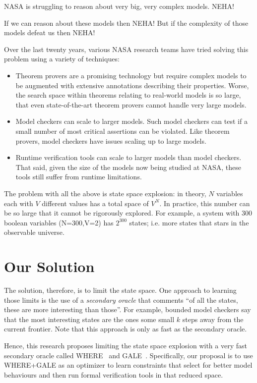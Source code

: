 \documentclass[12pt]{article}
\newcommand{\bi}{\begin{itemize}[leftmargin=0.7cm]}
\newcommand{\ei}{\end{itemize}}
\begin{document}
NASA is struggling to reason about very big, very complex models. NEHA! 

If we can reason about these models then NEHA! But if the complexity of those models
defeat us then NEHA!

Over the last twenty years, various
NASA research teams have tried solving this problem using a variety of techniques:
\bi
\item Theorem provers are a promising technology but require complex models to be augmented with extensive annotations describing their properties. Worse, the search space within theorems relating to real-world models is so large, that even state-of-the-art theorem provers cannot handle very large models.
\item Model checkers can scale to larger models. Such model checkers can test if a small number of most critical assertions can be violated. Like theorem provers, model checkers
have issues scaling up to large models.
\item Runtime verification tools can scale to larger models than model checkers. That
said, given the size of the models now being studied at NASA, these tools still suffer
from runtime limitations.
\ei
The problem with all the above is   state space explosion: in theory,
$N$ variables each with $V$ different values has a total space of $V^N$. In practice,
this number can be so large that it cannot be rigorously explored. For example, a system 
with 300 boolean variables (N=300,V=2) has $2^300$ states; i.e. more states that stars in the observable universe.

\section{Our Solution}

The solution, therefore, is to limit the state space. One approach to learning those limits
is the use of a {\em secondary oracle} that comments ``of all the states, these are more interesting than those''. For example, bounded model checkers say that the most interesting states are the ones some small $k$ steps away from the current frontier. Note that this approach is only as fast  as the secondary oracle.

Hence, this research proposes limiting the state space explosion with a very fast secondary oracle called WHERE~\cite{me12d} and GALE~\cite{krall2015gale}. 
Specifically, 
our proposal is to use WHERE+GALE as an optimizer to learn constraints that select for better model behaviours and then run formal verification tools in that reduced space.
\end{document}
